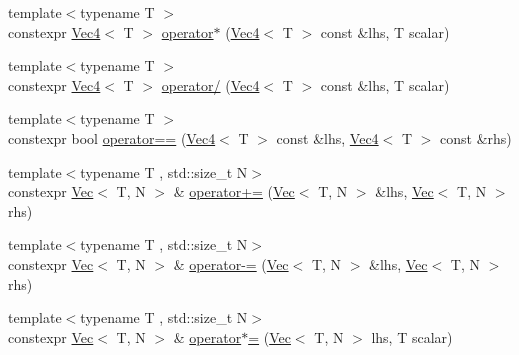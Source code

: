 \begin{DoxyCompactItemize}
\item 
{\footnotesize template$<$typename T $>$ }\\constexpr \mbox{\hyperlink{namespace_saturn_1_1_math_a311b3d690ef397050af7963caa08d1bd}{Vec4}}$<$ T $>$ \mbox{\hyperlink{namespace_saturn_1_1_math_a046fc8386350eb6d515e4d6f30f17d67}{operator$\ast$}} (\mbox{\hyperlink{namespace_saturn_1_1_math_a311b3d690ef397050af7963caa08d1bd}{Vec4}}$<$ T $>$ const \&lhs, T scalar)
\item 
{\footnotesize template$<$typename T $>$ }\\constexpr \mbox{\hyperlink{namespace_saturn_1_1_math_a311b3d690ef397050af7963caa08d1bd}{Vec4}}$<$ T $>$ \mbox{\hyperlink{namespace_saturn_1_1_math_a10c2fa86db458a948933e3ed17707b2f}{operator/}} (\mbox{\hyperlink{namespace_saturn_1_1_math_a311b3d690ef397050af7963caa08d1bd}{Vec4}}$<$ T $>$ const \&lhs, T scalar)
\item 
{\footnotesize template$<$typename T $>$ }\\constexpr bool \mbox{\hyperlink{namespace_saturn_1_1_math_a02dbf2e6adae7e40b3514e665576653e}{operator==}} (\mbox{\hyperlink{namespace_saturn_1_1_math_a311b3d690ef397050af7963caa08d1bd}{Vec4}}$<$ T $>$ const \&lhs, \mbox{\hyperlink{namespace_saturn_1_1_math_a311b3d690ef397050af7963caa08d1bd}{Vec4}}$<$ T $>$ const \&rhs)
\item 
{\footnotesize template$<$typename T , std\+::size\+\_\+t N$>$ }\\constexpr \mbox{\hyperlink{class_saturn_1_1_math_1_1_vec}{Vec}}$<$ T, N $>$ \& \mbox{\hyperlink{namespace_saturn_1_1_math_a488f67c55f544298aa09600880e6f163}{operator+=}} (\mbox{\hyperlink{class_saturn_1_1_math_1_1_vec}{Vec}}$<$ T, N $>$ \&lhs, \mbox{\hyperlink{class_saturn_1_1_math_1_1_vec}{Vec}}$<$ T, N $>$ rhs)
\item 
{\footnotesize template$<$typename T , std\+::size\+\_\+t N$>$ }\\constexpr \mbox{\hyperlink{class_saturn_1_1_math_1_1_vec}{Vec}}$<$ T, N $>$ \& \mbox{\hyperlink{namespace_saturn_1_1_math_aa9f21d7488fefb007e726e88369a6622}{operator-\/=}} (\mbox{\hyperlink{class_saturn_1_1_math_1_1_vec}{Vec}}$<$ T, N $>$ \&lhs, \mbox{\hyperlink{class_saturn_1_1_math_1_1_vec}{Vec}}$<$ T, N $>$ rhs)
\item 
{\footnotesize template$<$typename T , std\+::size\+\_\+t N$>$ }\\constexpr \mbox{\hyperlink{class_saturn_1_1_math_1_1_vec}{Vec}}$<$ T, N $>$ \& \mbox{\hyperlink{namespace_saturn_1_1_math_a7bfe08b15fdd66d20ee95faf2a3327cf}{operator$\ast$=}} (\mbox{\hyperlink{class_saturn_1_1_math_1_1_vec}{Vec}}$<$ T, N $>$ lhs, T scalar)

\end{DoxyCompactItemize}
